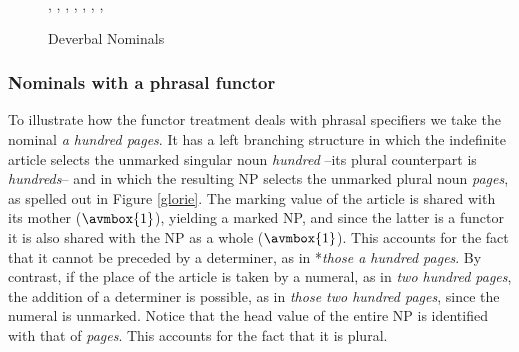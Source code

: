\documentclass[output=paper]{langsci/langscibook}
\begin{document}
\begin{figure}
\begin{center}
\footnotesize
\tree
{,
  {,
    {}},
  {,
    {,
      {}},  
    {,
      {}}}}
\caption{\label{possy} Deverbal Nominals }
\normalsize
\end{center}
\end{figure}


        
\subsubsection{Nominals with a phrasal functor} 


To illustrate how the functor treatment deals with phrasal specifiers we 
take the nominal {\it a hundred pages}. It has a left branching structure in
which the indefinite article selects the unmarked singular noun {\it hundred} --its plural 
counterpart is {\it hundreds}--  
and in which the resulting NP selects the unmarked plural noun 
{\it pages}, as spelled out in Figure \ref{glorie}. The  
{\sc marking} value of the article is shared with its mother ($\avmbox{1}$), 
yielding a marked NP, and since the latter is a functor it is also shared with 
the NP as a whole ($\avmbox{1}$). 
This accounts for the fact that it cannot be preceded by a determiner, 
as in *{\it those a hundred pages\/}. By contrast, if the place of the article is taken 
by a numeral, as in {\it two hundred pages}, the addition of a determiner is 
possible, as in {\it those two hundred pages}, since the numeral is unmarked. 
Notice that the {\sc head} value of the entire NP is identified with that 
of {\it pages\/}. This accounts for the fact that it is plural.  
 
\end{document}
